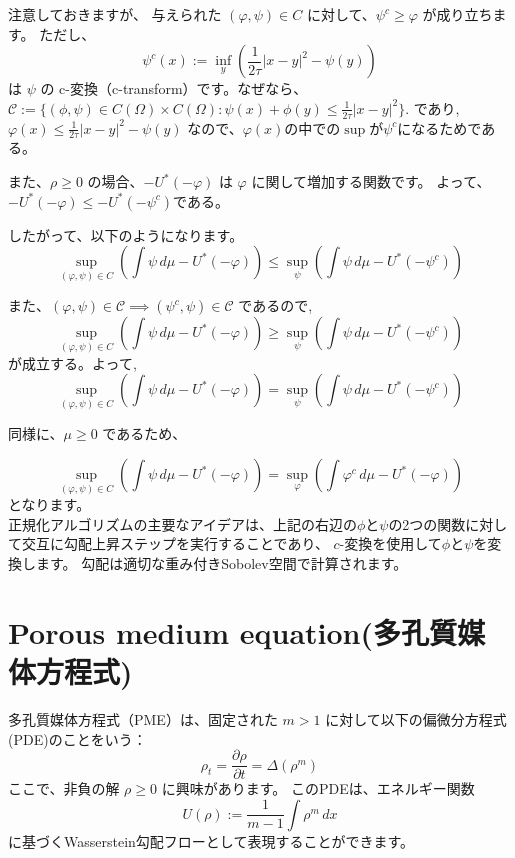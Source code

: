 \documentclass{jsarticle}
\theoremstyle{definition}
\begin{document}
注意しておきますが、
{\color{teal}
与えられた \((\varphi, \psi) \in C\) に対して、{\color{red}\(\psi^c \geq \varphi\) }が成り立ちます。
}
ただし、
\[
  \psi^c(x) := \inf_y \left( \frac{1}{2\tau}|x-y|^2 - \psi(y)\right)
\]
は \(\psi\) の c-変換（c-transform）です。なぜなら、
$
    \mathcal{C}  := \{(\phi, \psi) \in C(\Omega) \times C(\Omega) : \psi(x) + \phi(y) \leq \frac{1}{2 \tau} |x - y|^2 \}. 
$
であり,
$
  \varphi(x) \le \frac{1}{2\tau}|x-y|^2 - \psi(y)
$
なので、$\varphi(x)$の中での$\sup$が$\psi^c$になるためである。

また、\(\rho \geq 0\) の場合、\(- U^*(-\varphi)\) は \(\varphi\) に関して増加する関数です。
よって、{\color{red}$-U^*(- \varphi) \le -U^*(- \psi^c)$}である。


{\color{teal}したがって、以下のようになります。}
\[
\sup_{(\varphi, \psi) \in C} \left(\int \psi \, d\mu - U^*(- \varphi)\right) \le \sup_\psi \left(\int \psi \, d\mu - U^*(- \psi^c)\right)
\]

また、$(\varphi, \psi) \in \mathcal{C} \implies (\psi^c, \psi) \in \mathcal{C}$
であるので,
\[
\sup_{(\varphi, \psi) \in C} \left(\int \psi \, d\mu - U^*(- \varphi)\right) \ge \sup_\psi \left(\int \psi \, d\mu - U^*(- \psi^c)\right)
\]
が成立する。よって,
\begin{equation}
  \label{eq:psi^c}
\sup_{(\varphi, \psi) \in C} \left(\int \psi \, d\mu - U^*(- \varphi)\right) = \sup_\psi \left(\int \psi \, d\mu - U^*(- \psi^c)\right)
\end{equation}

同様に、\(\mu \geq 0\) であるため、

\begin{equation}
  \label{eq:phi^c}
  \sup_{(\varphi, \psi) \in C} \left(\int \psi \, d\mu - U^*(- \varphi)\right) = \sup_\varphi \left(\int \varphi^c \, d\mu - U^*(- \varphi)\right)
\end{equation}
となります。\\

正規化アルゴリズムの主要なアイデアは、上記の右辺の$\phi$と$\psi$の2つの関数に対して交互に勾配上昇ステップを実行することであり、
$c$-変換を使用して$\phi$と$\psi$を変換します。
勾配は適切な重み付きSobolev空間で計算されます。

\section{Porous medium equation(多孔質媒体方程式)}

多孔質媒体方程式（PME）は、固定された \(m > 1\) に対して以下の偏微分方程式(PDE)のことをいう：
\[
\rho_t = \frac{{\partial \rho}}{{\partial t}} = \Delta (\rho^m)
\]
ここで、非負の解 \(\rho \geq 0\) に興味があります。
このPDEは、エネルギー関数
\[
U(\rho) := \frac{1}{{m-1}} \int \rho^m \, dx
\]
に基づくWasserstein勾配フローとして表現することができます。
\end{document}
